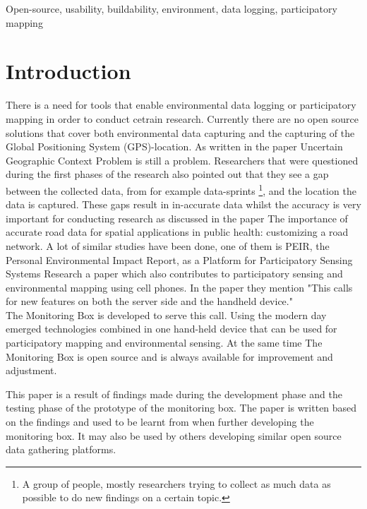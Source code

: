 \documentclass[conference]{IEEEtran}
\begin{document}
\begin{IEEEkeywords}
Open-source, usability, buildability, environment, data logging, participatory mapping 
\end{IEEEkeywords}

\IEEEpeerreviewmaketitle

\section{Introduction}
There is a need for tools that enable environmental data logging or participatory mapping in order to conduct cetrain research. Currently there are no open source solutions that cover both environmental data capturing and the capturing of the Global Positioning System (GPS)-location. As written in the paper Uncertain Geographic Context Problem \cite{kwan2012uncertain} is still a problem. Researchers that were questioned during the first phases of the research also pointed out that they see a gap  between the collected data, from for example data-sprints \footnote{A group of people, mostly researchers trying to collect as much data as possible to do new findings on a certain topic.}, and the location the data is captured. These gaps result in in-accurate data whilst the accuracy is very important for conducting research as discussed in the paper The importance of accurate road data for spatial applications in public health: customizing a road network. \cite{frizzelle2009importance}
A lot of similar studies have been done, one of them is PEIR, the Personal Environmental Impact Report, as a Platform for Participatory Sensing Systems Research \cite{mun2009peir} a paper which also contributes to participatory sensing and environmental mapping using cell phones. In the paper they mention "This calls for new
features on both the server side and the handheld device."  \cite{mun2009peir} \\
The Monitoring Box is developed to serve this call. Using the modern day emerged technologies combined in one hand-held device that can be used for participatory mapping and environmental sensing. At the same time The Monitoring Box is open source and is always available for improvement and adjustment.  

\par
This paper is a result of findings made during the development phase and the testing phase of the prototype of the monitoring box. The paper is written based on the findings and used to be learnt from when further developing the monitoring box. It may also be used by others developing similar open source data gathering platforms.
\end{document}
